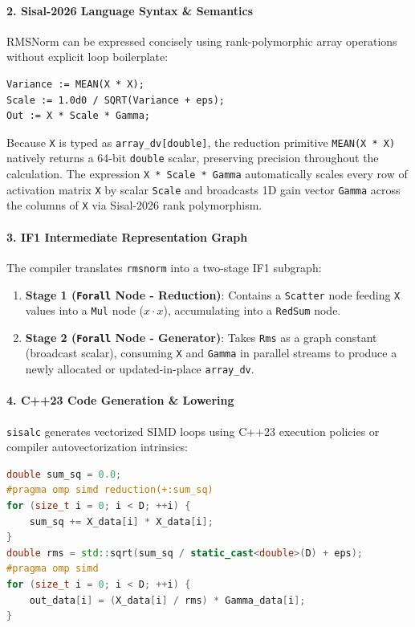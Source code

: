 \paragraph{2. Sisal-2026 Language Syntax \& Semantics}
RMSNorm can be expressed concisely using rank-polymorphic array operations without explicit loop boilerplate:
\begin{lstlisting}[language=Sisal]
Variance := MEAN(X * X);
Scale := 1.0d0 / SQRT(Variance + eps);
Out := X * Scale * Gamma;
\end{lstlisting}
Because \texttt{X} is typed as \texttt{array\_dv[double]}, the reduction primitive \texttt{MEAN(X * X)} natively returns a 64-bit \texttt{double} scalar, preserving precision throughout the calculation. The expression \texttt{X * Scale * Gamma} automatically scales every row of activation matrix \texttt{X} by scalar \texttt{Scale} and broadcasts 1D gain vector \texttt{Gamma} across the columns of \texttt{X} via Sisal-2026 rank polymorphism.

\paragraph{3. IF1 Intermediate Representation Graph}
The compiler translates \texttt{rmsnorm} into a two-stage IF1 subgraph:
\begin{enumerate}
  \item \textbf{Stage 1 (\texttt{Forall} Node - Reduction)}: Contains a \texttt{Scatter} node feeding \texttt{X} values into a \texttt{Mul} node ($x \cdot x$), accumulating into a \texttt{RedSum} node.
  \item \textbf{Stage 2 (\texttt{Forall} Node - Generator)}: Takes \texttt{Rms} as a graph constant (broadcast scalar), consuming \texttt{X} and \texttt{Gamma} in parallel streams to produce a newly allocated or updated-in-place \texttt{array\_dv}.
\end{enumerate}

\paragraph{4. C++23 Code Generation \& Lowering}
\texttt{sisalc} generates vectorized SIMD loops using C++23 execution policies or compiler autovectorization intrinsics:
\begin{lstlisting}[language=C++]
double sum_sq = 0.0;
#pragma omp simd reduction(+:sum_sq)
for (size_t i = 0; i < D; ++i) {
    sum_sq += X_data[i] * X_data[i];
}
double rms = std::sqrt(sum_sq / static_cast<double>(D) + eps);
#pragma omp simd
for (size_t i = 0; i < D; ++i) {
    out_data[i] = (X_data[i] / rms) * Gamma_data[i];
}
\end{lstlisting}

